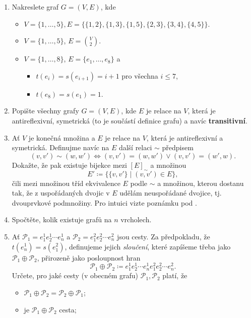 \begin{enumerate}
 \item Nakreslete graf $G = (V,E)$, kde
  \begin{itemize}
   \item $V = \{1,\ldots,5\}, E = \{\{1,2\}, \{1,3\}, \{1,5\}, \{2,3\},
    \{3,4\},\{4,5\}\}$.
   \item $V = \{1,\ldots,5\}$, $E = \binom{V}{2}$.
   \item $V = \{1,\ldots,8\}$, $E = \{e_1,\ldots,e_8\}$ a
   \begin{itemize}
    \item $t(e_i) = s(e_{i+1}) = i + 1$ pro všechna $i \leq 7$,
    \item $t(e_8) = s(e_1) = 1$.
   \end{itemize}
  \end{itemize}
 \item Popište všechny grafy $G = (V,E)$, kde $E$ je relace na $V$, která je
  antireflexivní, symetrická (to je součástí definice grafu) a navíc
  \textbf{transitivní}.
 \item Ať $V$ je konečná množina a $E$ je relace na $V$, která je antireflexivní
  a symetrická. Definujme navíc na $E$ další relaci $ \sim $ předpisem
  \[
   (v,v') \sim (w,w') \Leftrightarrow (v,v') = (w,w') \vee (v,v') = (w',w). 
  \]
  Dokažte, že pak existuje bijekce mezi $[E]_{ \sim }$ a množinou
  \[
   E' \coloneqq \{\{v,v'\} \mid (v,v') \in E\},
  \]
  čili mezi množinou tříd ekvivalence $E$ podle $ \sim $ a množinou, kterou
  dostanu tak, že z uspořádaných dvojic v $E$ udělám neuspořádané dvojice, tj.
  dvouprvkové podmnožiny. Pro intuici vizte poznámku pod
  .
 \item Spočtěte, kolik existuje grafů na $n$ vrcholech.
 \item Ať $\mathcal{P}_1 = e_1^{1}e_2^{1}\cdots e_n^{1}$ a $\mathcal{P}_2 =
  e_1^2e_2^2\cdots e_n^2$ jsou cesty. Za předpokladu, že $t(e_n^{1}) = s(e_1^2)$,
  definujeme jejich \emph{sloučení}, které zapíšeme třeba jako $\mathcal{P}_1
  \oplus \mathcal{P}_2$, přirozeně jako posloupnost hran
  \[
   \mathcal{P}_1 \oplus \mathcal{P}_2 \coloneqq e_1^{1}e_2^{1}\cdots
   e_n^{1}e_1^2e_2^2\cdots e_n^2.
  \]
  Určete, pro jaké cesty (v obecném grafu) $\mathcal{P}_1, \mathcal{P}_2$ platí,
  že
  \begin{itemize}
   \item $\mathcal{P}_1 \oplus \mathcal{P}_2 = \mathcal{P}_2 \oplus
    \mathcal{P}_1$;
   \item je $\mathcal{P}_1 \oplus \mathcal{P}_2$ cesta;

\end{itemize}
\end{enumerate}
